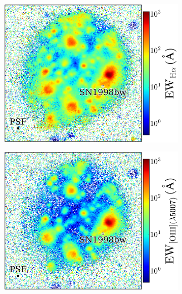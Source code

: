 \documentclass[traditabstract, referee]{aa}
\begin{document}
\begin{figure}
\begin{subfigure}{.2425\textwidth}
  \includegraphics[width=1.0\linewidth]{Figs/MUSE_SN1998bw_HaEW.pdf}
\end{subfigure}
\begin{subfigure}{.2425\textwidth}
  \includegraphics[width=1.0\linewidth]{Figs/MUSE_SN1998bw_OIIIEW.pdf}
\end{subfigure}
\begin{subfigure}{.2425\textwidth}

\end{subfigure}
\end{figure}
\end{document}
